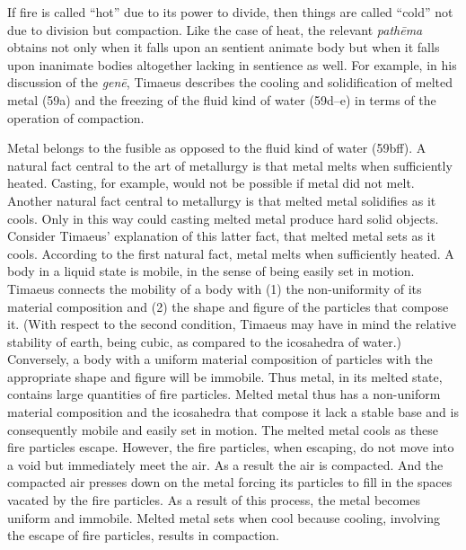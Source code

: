 If fire is called ``hot'' due to its power to divide, then things are called ``cold'' not due to division but compaction. Like the case of heat, the relevant \emph{pathēma} obtains not only when it falls upon an sentient animate body but when it falls upon inanimate bodies altogether lacking in sentience as well. For example, in his discussion of the \emph{genē}, Timaeus describes the cooling and solidification of melted metal (59a) and the freezing of the fluid kind of water (59d--e) in terms of the operation of compaction. 

Metal belongs to the fusible as opposed to the fluid kind of water (59bff). A natural fact central to the art of metallurgy is that metal melts when sufficiently heated. Casting, for example, would not be possible if metal did not melt. Another natural fact central to metallurgy is that melted metal solidifies as it cools. Only in this way could casting melted metal produce hard solid objects. Consider Timaeus' explanation of this latter fact, that melted metal sets as it cools. According to the first natural fact, metal melts when sufficiently heated. A body in a liquid state is mobile, in the sense of being easily set in motion. Timaeus connects the mobility of a body with (1) the non-uniformity of its material composition and (2) the shape and figure of the particles that compose it. (With respect to the second condition, Timaeus may have in mind the relative stability of earth, being cubic, as compared to the icosahedra of water.) Conversely, a body with a uniform material composition of particles with the appropriate shape and figure will be immobile. Thus metal, in its melted state, contains large quantities of fire particles. Melted metal thus has a non-uniform material composition and the icosahedra that compose it lack a stable base and is consequently mobile and easily set in motion. The melted metal cools as these fire particles escape. However, the fire particles, when escaping, do not move into a void but immediately meet the air. As a result the air is compacted. And the compacted air presses down on the metal forcing its particles to fill in the spaces vacated by the fire particles. As a result of this process, the metal becomes uniform and immobile. Melted metal sets when cool because cooling, involving the escape of fire particles, results in compaction.


